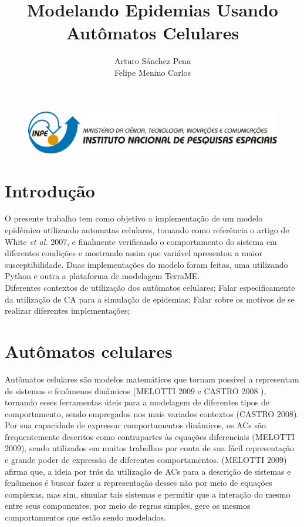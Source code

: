 \documentclass[a4paper,12pt]{article}
\begin{document}
\begin{figure}
 \begin{center}
  \includegraphics[width=1\linewidth]{fig/logoinpe.png}
 \end{center}
\end{figure}

\setlength{\textfloatsep}{0pt}

\title{Modelando Epidemias Usando Autômatos Celulares}
    
\author{Arturo Sánchez Pena \\ Felipe Menino Carlos}
\date{}

\maketitle

\section{Introdução}

O presente trabalho tem como objetivo a implementação de um modelo epidêmico utilizando automatas celulares, tomando como referência o artigo de White \textit{et al.} 2007, e finalmente verificando o comportamento do sistema em diferentes condições e mostrando assim que variável apresentou a maior susceptibilidade. Duas implementações do modelo foram feitas, uma utilizando Python e outra a plataforma de modelagem TerraME.\\

Diferentes contextos de utilização dos autômatos celulares;
Falar especificamente da utilização de CA para a simulação de epidemias;
Falar sobre os motivos de se realizar diferentes implementações;

\section{Autômatos celulares}
\par Autômatos celulares são modelos matemáticos que tornam possível a representam de sistemas e fenômenos dinâmicos (MELOTTI 2009 \cite{Melotti2009} e CASTRO 2008 \cite{Castro2008}), tornando esses ferramentas úteis para a modelagem de diferentes tipos de comportamento, sendo empregados nos mais variados contextos (CASTRO 2008\cite{Castro2008}). Por sua capacidade de expressar comportamentos dinâmicos, os ACs são frequentemente descritos como contrapartes às equações diferenciais (MELOTTI 2009\cite{Melotti2009}), sendo utilizados em muitos trabalhos por conta de sua fácil representação e grande poder de expressão de diferentes comportamentos. (MELOTTI 2009\cite{Melotti2009}) afirma que, a ideia por trás da utilização de ACs para a descrição de sistemas e fenômenos é buscar fazer a representação desses não por meio de equações complexas, mas sim, simular tais sistemas e permitir que a interação do mesmo entre seus componentes, por meio de regras simples, gere os mesmos comportamentos que estão sendo modelados. 
\end{document}
